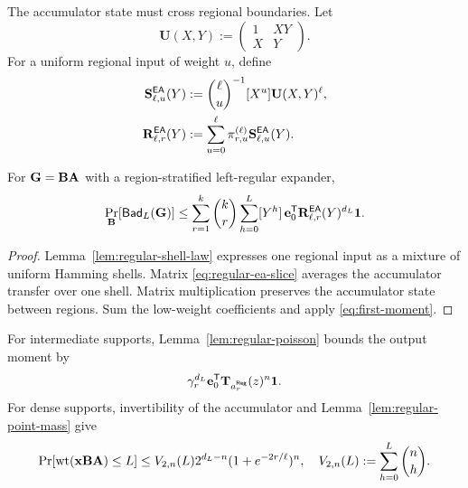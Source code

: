 The accumulator state must cross regional boundaries.  Let
\begin{equation}
 \mathbf U(X,Y):=
 \begin{pmatrix}1&XY\\X&Y\end{pmatrix}.
 \label{eq:regular-ea-input-transfer}
\end{equation}
For a uniform regional input of weight $u$, define
\begin{align}
 \mathbf S^{\mathsf{EA}}_{\ell,u}(Y)
 &:=\binom{\ell}{u}^{-1}[X^u]\mathbf U(X,Y)^\ell,
 \label{eq:regular-ea-slice}\\
 \mathbf R^{\mathsf{EA}}_{\ell,r}(Y)
 &:=\sum_{u=0}^{\ell}\pi^{(\ell)}_{r,u}
 \mathbf S^{\mathsf{EA}}_{\ell,u}(Y).
 \label{eq:regular-ea-region}
\end{align}

\begin{theorem}
\label{thm:regular-ea-first-moment}
For $\mathbf G=\mathbf B\mathbf A$ with a region-stratified left-regular expander,
\begin{equation}
 \Pr_{\mathbf B}[\mathsf{Bad}_L(\mathbf G)]\leq
 \sum_{r=1}^{k}\binom{k}{r}\sum_{h=0}^{L}[Y^h]\,
 \mathbf e_0^{\mathsf T}
 \mathbf R^{\mathsf{EA}}_{\ell,r}(Y)^{d_L}\mathbf 1.
 \label{eq:regular-ea-first-moment}
\end{equation}
\end{theorem}

\begin{proof}
Lemma~\ref{lem:regular-shell-law} expresses one regional input as a mixture of
uniform Hamming shells.  Matrix \eqref{eq:regular-ea-slice} averages the
accumulator transfer over one shell.  Matrix multiplication preserves the
accumulator state between regions.  Sum the low-weight coefficients and apply
\eqref{eq:first-moment}.
\end{proof}

For intermediate supports, Lemma~\ref{lem:regular-poisson} bounds the output
moment by
\begin{equation}
 \gamma_r^{d_L}\mathbf e_0^{\mathsf T}
 \mathbf T_{a^{\mathsf{Reg}}_r}(z)^n\mathbf 1.
 \label{eq:regular-ea-poisson-moment}
\end{equation}
For dense supports, invertibility of the accumulator and
Lemma~\ref{lem:regular-point-mass} give
\begin{equation}
 \Pr[\operatorname{wt}(\mathbf x\mathbf B\mathbf A)\leq L]
 \leq V_{2,n}(L)2^{d_L-n}(1+e^{-2r/\ell})^n,
 \quad
 V_{2,n}(L):=\sum_{h=0}^{L}\binom nh.
 \label{eq:regular-ea-dense}
\end{equation}

